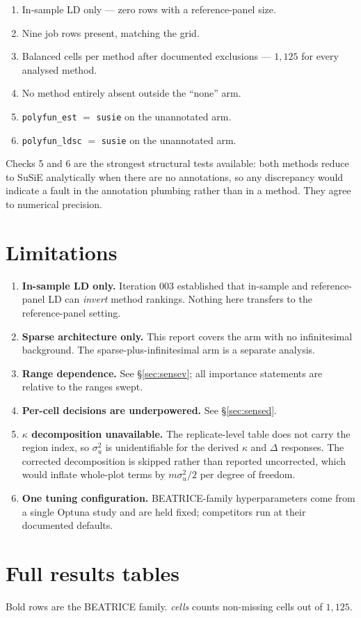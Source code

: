 \documentclass[11pt,a4paper]{article}
\begin{document}
\begin{enumerate}
\item In-sample LD only --- zero rows with a reference-panel size.
\item Nine job rows present, matching the grid.
\item Balanced cells per method after documented exclusions --- $1{,}125$ for
every analysed method.
\item No method entirely absent outside the ``none'' arm.
\item \texttt{polyfun\_est} $=$ \texttt{susie} on the unannotated arm.
\item \texttt{polyfun\_ldsc} $=$ \texttt{susie} on the unannotated arm.
\end{enumerate}

Checks 5 and 6 are the strongest structural tests available: both methods reduce
to SuSiE analytically when there are no annotations, so any discrepancy would
indicate a fault in the annotation plumbing rather than in a method. They agree
to numerical precision.

\section{Limitations}\label{sec:limits}

\begin{enumerate}
\item \textbf{In-sample LD only.} Iteration 003 established that in-sample and
reference-panel LD can \emph{invert} method rankings. Nothing here transfers to
the reference-panel setting.
\item \textbf{Sparse architecture only.} This report covers the arm with no
infinitesimal background. The sparse-plus-infinitesimal arm is a separate
analysis.
\item \textbf{Range dependence.} See \S\ref{sec:sensev}; all importance
statements are relative to the ranges swept.
\item \textbf{Per-cell decisions are underpowered.} See \S\ref{sec:sensed}.
\item \textbf{$\kappa$ decomposition unavailable.} The replicate-level table
does not carry the region index, so $\sigma^2_u$ is unidentifiable for the
derived $\kappa$ and $\Delta$ responses. The corrected decomposition is skipped
rather than reported uncorrected, which would inflate whole-plot terms by
$m\sigma^2_u/2$ per degree of freedom.
\item \textbf{One tuning configuration.} BEATRICE-family hyperparameters come
from a single Optuna study and are held fixed; competitors run at their
documented defaults.
\end{enumerate}

\section{Full results tables}\label{sec:tables}

Bold rows are the BEATRICE family. \emph{cells} counts non-missing cells out of
$1{,}125$.


\end{document}
